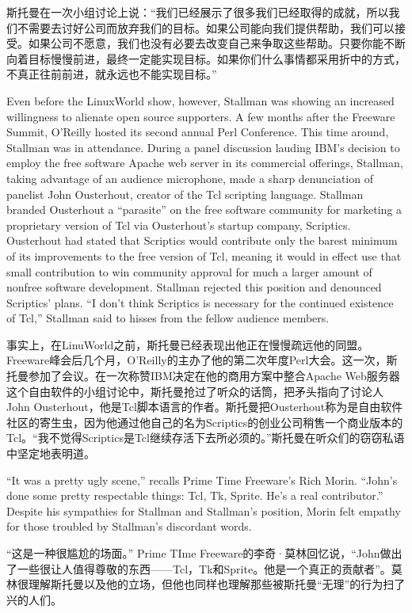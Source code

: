 \ifdefined\chs
斯托曼在一次小组讨论上说：``我们已经展示了很多我们已经取得的成就，所以我们不需要去讨好公司而放弃我们的目标。如果公司能向我们提供帮助，我们可以接受。如果公司不愿意，我们也没有必要去改变自己来争取这些帮助。只要你能不断向着目标慢慢前进，最终一定能实现目标。如果你们什么事情都采用折中的方式，不真正往前前进，就永远也不能实现目标。''
\fi

\ifdefined\eng
Even before the LinuxWorld show, however, Stallman was showing an increased willingness to alienate open source supporters. A few months after the Freeware Summit, O'Reilly hosted its second annual Perl Conference. This time around, Stallman was in attendance. During a panel discussion lauding IBM's decision to employ the free software Apache web server in its commercial offerings, Stallman, taking advantage of an audience microphone, made a sharp denunciation of panelist John Ousterhout, creator of the Tcl scripting language. Stallman branded Ousterhout a ``parasite'' on the free software community for marketing a proprietary version of Tcl via Ousterhout's startup company, Scriptics.  Ousterhout had stated that Scriptics would contribute only the barest minimum of its improvements to the free version of Tcl, meaning it would in effect use that small contribution to win community approval for much a larger amount of nonfree software development.  Stallman rejected this position and denounced Scriptics' plans. ``I don't think Scriptics is necessary for the continued existence of Tcl,'' Stallman said to hisses from the fellow audience members.
\fi

\ifdefined\chs
事实上，在LinuWorld之前，斯托曼已经表现出他正在慢慢疏远他的同盟。Freeware峰会后几个月，O'Reilly的主办了他的第二次年度Perl大会。这一次，斯托曼参加了会议。在一次称赞IBM决定在他的商用方案中整合Apache Web服务器这个自由软件的小组讨论中，斯托曼抢过了听众的话筒，把矛头指向了讨论人John Ousterhout，他是Tcl脚本语言的作者。斯托曼把Ousterhout称为是自由软件社区的寄生虫，因为他通过他自己的名为Scriptics的创业公司稍售一个商业版本的Tcl。``我不觉得Scriptics是Tcl继续存活下去所必须的。''斯托曼在听众们的窃窃私语中坚定地表明道。
\fi

\ifdefined\eng
``It was a pretty ugly scene,'' recalls Prime Time Freeware's Rich Morin. ``John's done some pretty respectable things: Tcl, Tk, Sprite. He's a real contributor.''  Despite his sympathies for Stallman and Stallman's position, Morin felt empathy for those troubled by Stallman's discordant words.
\fi

\ifdefined\chs
``这是一种很尴尬的场面。'' Prime TIme Freeware的李奇·莫林回忆说，``John做出了一些很让人值得尊敬的东西——Tcl，Tk和Sprite。他是一个真正的贡献者''。莫林很理解斯托曼以及他的立场，但他也同样也理解那些被斯托曼``无理''的行为扫了兴的人们。
\fi

